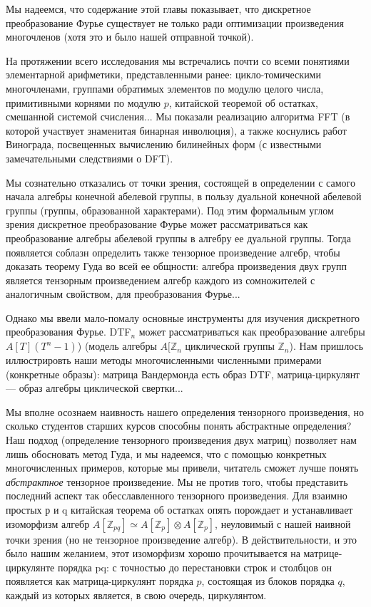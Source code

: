 \documentclass{mai_book}
\begin{document}
Мы надеемся, что содержание этой главы показывает, что дискретное преобразование Фурье существует не только ради оптимизации произведения многочленов (хотя это и было нашей отправной точкой). \par

На протяжении всего исследования мы встречались почти со всеми понятиями элементарной арифметики, представленными ранее: цикло-томическими многочленами, группами обратимых элементов по  модулю целого числа, примитивными корнями по модулю $p$, китайской  теоремой об остатках, смешанной системой счисления... Мы показали реализацию алгоритма FFT (в которой участвует знаменитая бинарная инволюция), а также коснулись работ Винограда, посвещенных  вычислению билинейных форм (с известными замечательными следствиями о DFT). \par
Мы сознательно отказались от точки зрения, состоящей в определении с самого начала алгебры конечной абелевой группы, в пользу дуальной конечной абелевой группы (группы, образованной  характерами). Под этим формальным углом зрения дискретное преобразование Фурье может рассматриваться как преобразование алгебры абелевой группы в алгебру ее дуальной группы. Тогда появляется соблазн  определить также тензорное произведение алгебр, чтобы доказать теорему Гуда во всей ее общности: алгебра произведения двух групп является тензорным произведением алгебр каждого из сомножителей с  аналогичным свойством, для преобразования Фурье... \par
Однако мы ввели мало-помалу основные инструменты для изучения дискретного преобразования Фурье. DTF$_n$ может рассматриваться как преобразование алгебры $A[T](T^n-1)$) (модель алгебры $A[\mathbb{Z}_n$  циклической группы $\mathbb{Z}_n$). Нам пришлось иллюстрировть наши методы  многочисленными численными примерами (конкретные образы): матрица Вандермонда есть образ DTF, матрица-циркулянт --- образ алгебры циклической свертки...\par
Мы вполне осознаем наивность нашего определения тензорного  произведения, но сколько студентов старших курсов способны понять  абстрактные определения? Наш подход (определение тензорного  произведения двух матриц) позволяет нам лишь обосновать метод Гуда, и мы надеемся, что с помощью конкретных многочисленных примеров, которые мы привели, читатель сможет лучше понять \textit{абстрактное}  тензорное произведение. Мы не против того, чтобы представить  последний аспект так обесславленного тензорного произведения. Для взаимно простых р и q китайская теорема об остатках опять порождает и  устанавливает изоморфизм алгебр $A[\mathbb{Z}_{pq}] \simeq A[\mathbb{Z}_p] \otimes A[\mathbb{Z}_p]$, неуловимый с нашей наивной точки зрения (но не тензорное произведение алгебр). В действительности, и это было нашим желанием, этот изоморфизм  хорошо прочитывается на матрице-циркулянте порядка pq: с точностью до перестановки строк и столбцов он появляется как матрица-циркулянт
\newpage
порядка $p$, состоящая из блоков порядка $q$, каждый из которых является, в свою очередь, циркулянтом.\ 
\hspace{5pt}
\end{document}
